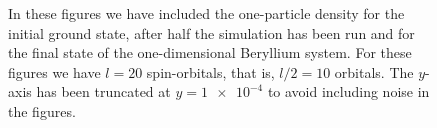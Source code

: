 \begin{figure}
            \caption{In these figures we have included the one-particle
            density for the initial ground state, after half the simulation
            has been run and for the final state of the one-dimensional
            Beryllium system.
            For these figures we have $l = 20$ spin-orbitals, that is, $l /
            2 = 10$ orbitals.
            The $y$-axis has been truncated at $y = \num{1e-4}$ to avoid
            including noise in the figures.}
            \label{fig:one-particle-density-miyagi}
        \end{figure}


